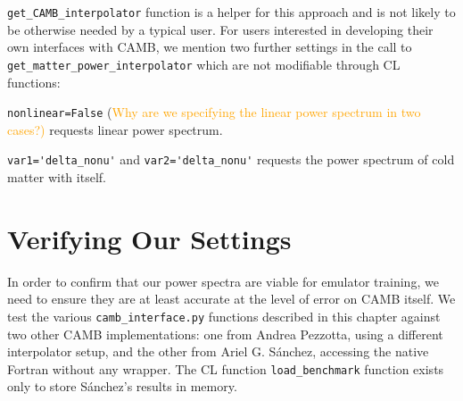 \verb|get_CAMB_interpolator| function is a helper for this approach and is not 
likely to be otherwise needed by a typical user. For users interested in
developing their own interfaces with CAMB, we mention two further
settings in the call to \verb|get_matter_power_interpolator| which are not
modifiable through CL functions:

\verb|nonlinear=False| (\textcolor{orange}{Why are we specifying the linear
power spectrum in two cases?)} \quad requests linear power spectrum.

\verb|var1='delta_nonu'| and \verb|var2='delta_nonu'| requests the power
spectrum of cold matter with itself.


\section{Verifying Our Settings}
\label{sec: CAMB_validation}

In order to confirm that our power spectra are viable for emulator training,
we need to ensure they are at least accurate at the level of error on CAMB
itself. We test the various \verb|camb_interface.py| functions described in
this chapter against two other CAMB implementations: one from Andrea Pezzotta,
using a different interpolator setup, and the other from Ariel G. S\'{a}nchez,
accessing the native Fortran without any wrapper. The CL function
\verb|load_benchmark| function exists only to store S\'{a}nchez's results in
memory.

